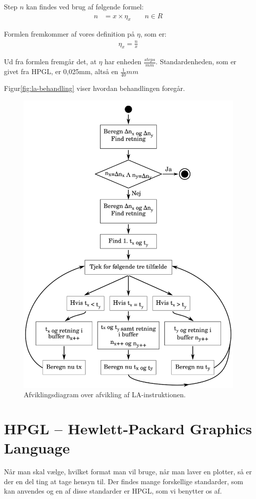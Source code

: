 Step $n$ kan findes ved brug af følgende formel:
\begin{align}
n &= x \times \eta_x \qquad n \in{R}
\end{align}

Formlen fremkommer af vores definition på $\eta$, som er:
\begin{align*}
\eta_x = \frac{n}{x}
\end{align*}

Ud fra formlen fremgår det, at $\eta$ har enheden $\frac{steps}{mm}$.
Standardenheden, som er givet fra HPGL, er 0,025mm, altså en $\frac{1}{40}mm$

Figur\vref{fig:la-behandling} viser hvordan behandlingen foregår.
\begin{figure}[htbp]
  \centering
  \includegraphics[width=.75\textwidth]{./img/la-behandling}
  \caption{Afviklingsdiagram over afvikling af LA-instruktionen.}
  \label{fig:la-behandling}
\end{figure}

\section{HPGL -- Hewlett-Packard Graphics Language}

Når man skal vælge, hvilket format man vil bruge, når man laver en
plotter, så er der en del ting at tage hensyn til. Der findes mange
forskellige standarder, som kan anvendes og en af disse standarder er
HPGL, som vi benytter os af.

